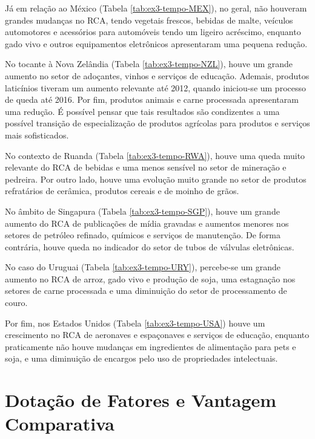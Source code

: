 Já em relação ao México (Tabela \ref{tab:ex3-tempo-MEX}), no geral, não houveram grandes mudanças no RCA, tendo vegetais frescos, bebidas de malte, veículos automotores e acessórios para automóveis tendo um ligeiro acréscimo, enquanto gado vivo e outros equipamentos eletrônicos apresentaram uma pequena redução.

No tocante à Nova Zelândia (Tabela \ref{tab:ex3-tempo-NZL}), houve um grande aumento no setor de adoçantes, vinhos e serviços de educação. Ademais, produtos laticínios tiveram um aumento relevante até 2012, quando iniciou-se um processo de queda até 2016. Por fim, produtos animais e carne processada apresentaram uma redução. É possível pensar que tais resultados são condizentes a uma possível transição de especialização de produtos agrícolas para produtos e serviços mais sofisticados.

No contexto de Ruanda (Tabela \ref{tab:ex3-tempo-RWA}), houve uma queda muito relevante do RCA de bebidas e uma menos sensível no setor de mineração e pedreira. Por outro lado, houve uma evolução muito grande no setor de produtos refratários de cerâmica, produtos cereais e de moinho de grãos.

No âmbito de Singapura (Tabela \ref{tab:ex3-tempo-SGP}), houve um grande aumento do RCA de publicações de mídia gravadas e aumentos menores nos setores de petróleo refinado, químicos e serviços de manutenção. De forma contrária, houve queda no indicador do setor de tubos de válvulas eletrônicas.

No caso do Uruguai (Tabela \ref{tab:ex3-tempo-URY}), percebe-se um grande aumento no RCA de arroz, gado vivo e produção de soja, uma estagnação nos setores de carne processada e uma diminuição do setor de processamento de couro. 

Por fim, nos Estados Unidos (Tabela \ref{tab:ex3-tempo-USA}) houve um crescimento no RCA de aeronaves e espaçonaves e serviços de educação, enquanto praticamente não houve mudanças em ingredientes de alimentação para pets e soja, e uma diminuição de encargos pelo uso de propriedades intelectuais. 

\clearpage
\section{Dotação de Fatores e Vantagem Comparativa}
\setcounter{subsection}{4}

\subsection{}

